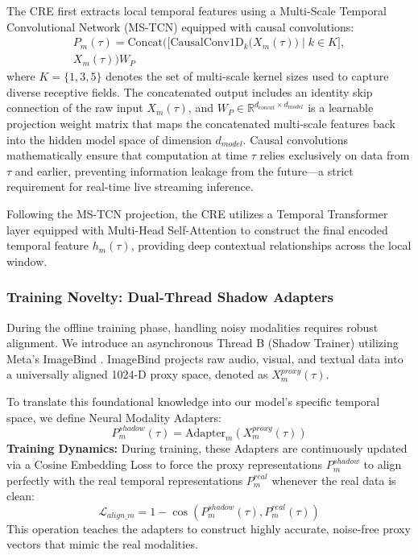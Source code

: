 \documentclass[sn-mathphys,Numbered]{sn-jnl}
\theoremstyle{thmstyleone}
\theoremstyle{thmstyletwo}
\theoremstyle{thmstylethree}
\begin{document}
The CRE first extracts local temporal features using a Multi-Scale Temporal Convolutional Network (MS-TCN) equipped with causal convolutions:
\begin{equation}
\begin{split}
    P_m(\tau) = \text{Concat}\Big(\big[\text{CausalConv1D}_{k}\big(X_m(\tau)\big) \mid k \in K\big], \\
    X_m(\tau) \Big) W_P
\end{split}
\end{equation}
where $K = \{1, 3, 5\}$ denotes the set of multi-scale kernel sizes used to capture diverse receptive fields. The concatenated output includes an identity skip connection of the raw input $X_m(\tau)$, and $W_P \in \mathbb{R}^{d_{concat} \times d_{model}}$ is a learnable projection weight matrix that maps the concatenated multi-scale features back into the hidden model space of dimension $d_{model}$. Causal convolutions mathematically ensure that computation at time $\tau$ relies exclusively on data from $\tau$ and earlier, preventing information leakage from the future—a strict requirement for real-time live streaming inference. 

Following the MS-TCN projection, the CRE utilizes a Temporal Transformer layer equipped with Multi-Head Self-Attention to construct the final encoded temporal feature $h_m(\tau)$, providing deep contextual relationships across the local window.

\subsubsection{Training Novelty: Dual-Thread Shadow Adapters}
During the offline training phase, handling noisy modalities requires robust alignment. We introduce an asynchronous Thread B (Shadow Trainer) utilizing Meta's ImageBind \cite{girdhar2023imagebind}. ImageBind projects raw audio, visual, and textual data into a universally aligned 1024-D proxy space, denoted as $X_m^{proxy}(\tau)$. 

To translate this foundational knowledge into our model's specific temporal space, we define Neural Modality Adapters:
\begin{equation}
    P_m^{shadow}(\tau) = \text{Adapter}_m(X_m^{proxy}(\tau))
\end{equation}
\textbf{Training Dynamics:} During training, these Adapters are continuously updated via a Cosine Embedding Loss to force the proxy representations $P_m^{shadow}$ to align perfectly with the real temporal representations $P_m^{real}$ whenever the real data is clean:
\begin{equation}
    \mathcal{L}_{align\_m} = 1 - \cos(P_m^{shadow}(\tau), P_m^{real}(\tau))
\end{equation}
This operation teaches the adapters to construct highly accurate, noise-free proxy vectors that mimic the real modalities.
\end{document}
